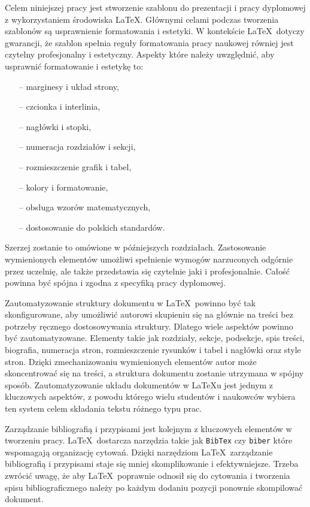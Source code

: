 
Celem niniejszej pracy jest stworzenie szablonu do prezentacji i pracy dyplomowej z wykorzystaniem środowiska \LaTeX. 
Głównymi celami podczas tworzenia szablonów są usprawnienie formatowania i estetyki. 
W kontekście \LaTeX\ dotyczy gwarancji, że szablon spełnia reguły formatowania pracy naukowej równiej jest czytelny profesjonalny i estetyczny. Aspekty które należy uwzględnić, aby usprawnić formatowanie i estetykę to: 

\begin{itemize}
\item[--] marginesy i układ strony,
\item[--] czcionka i interlinia, 
\item[--] nagłówki i stopki,
\item[--] numeracja rozdziałów i sekcji,
\item[--] rozmieszczenie grafik i tabel,
\item[--] kolory i formatowanie,
\item[--] obsługa wzorów matematycznych,
\item[--] dostosowanie do polskich standardów. 
\end{itemize}
Szerzej zostanie to omówione w późniejszych rozdziałach. 
Zastosowanie wymienionych elementów umożliwi spełnienie wymogów narzuconych odgórnie przez uczelnię, ale także przedstawia się czytelnie jaki i profesjonalnie. Całość powinna być spójna i zgodna z specyfiką pracy dyplomowej.

Zautomatyzowanie struktury dokumentu w \LaTeX\ powinno być tak skonfigurowane, aby umożliwić autorowi skupieniu się na głównie na treści bez potrzeby ręcznego dostosowywania struktury. Dlatego wiele aspektów powinno być zautomatyzowane. Elementy takie jak rozdziały, sekcje, podsekcje, spis treści, biografia, numeracja stron, rozmieszczenie rysunków i tabel i nagłówki oraz style stron. Dzięki zmechanizowaniu wymienionych elementów autor może skoncentrować się na treści, a struktura dokumentu zostanie utrzymana w spójny sposób. Zautomatyzowanie układu dokumentów w \LaTeX{u} jest jednym z kluczowych aspektów, z powodu którego wielu studentów i naukowców wybiera ten system celem składania tekstu różnego typu prac.

Zarządzanie bibliografią i przypisami jest kolejnym z kluczowych elementów w tworzeniu pracy. \LaTeX\ dostarcza narzędzia takie jak \texttt{BibTex} czy \texttt{biber} które wspomagają organizację cytowań. Dzięki narzędziom \LaTeX\ zarządzanie bibliografią i przypisami staje się mniej skomplikowanie i efektywniejsze. Trzeba zwrócić uwagę, że aby \LaTeX\ poprawnie odnosił się do cytowania i tworzenia spisu bibliograficznego należy po każdym dodaniu pozycji ponownie skompilować dokument. 

